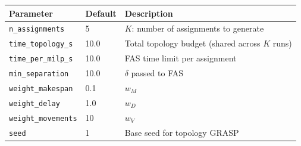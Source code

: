 \begin{center}
\begin{tabular}{lll}
\toprule
Parameter & Default & Description \\
\midrule
\texttt{n\_assignments}   & 5    & $K$: number of assignments to generate \\
\texttt{time\_topology\_s} & 10.0 & Total topology budget (shared across $K$ runs) \\
\texttt{time\_per\_milp\_s} & 10.0 & FAS time limit per assignment \\
\texttt{min\_separation}  & 10.0 & $\delta$ passed to FAS \\
\texttt{weight\_makespan} & 0.1  & $w_M$ \\
\texttt{weight\_delay}    & 1.0  & $w_D$ \\
\texttt{weight\_movements}& 10   & $w_V$ \\
\texttt{seed}             & 1    & Base seed for topology GRASP \\
\bottomrule
\end{tabular}
\end{center}
